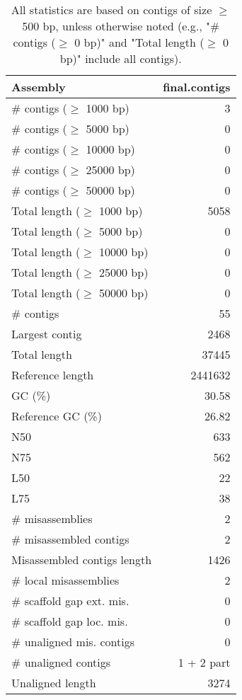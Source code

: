 \documentclass[12pt,a4paper]{article}
\begin{document}
\begin{table}[ht]
\begin{center}
\caption{All statistics are based on contigs of size $\geq$ 500 bp, unless otherwise noted (e.g., "\# contigs ($\geq$ 0 bp)" and "Total length ($\geq$ 0 bp)" include all contigs).}
\begin{tabular}{|l*{1}{|r}|}
\hline
Assembly & final.contigs \\ \hline
\# contigs ($\geq$ 1000 bp) & 3 \\ \hline
\# contigs ($\geq$ 5000 bp) & 0 \\ \hline
\# contigs ($\geq$ 10000 bp) & 0 \\ \hline
\# contigs ($\geq$ 25000 bp) & 0 \\ \hline
\# contigs ($\geq$ 50000 bp) & 0 \\ \hline
Total length ($\geq$ 1000 bp) & 5058 \\ \hline
Total length ($\geq$ 5000 bp) & 0 \\ \hline
Total length ($\geq$ 10000 bp) & 0 \\ \hline
Total length ($\geq$ 25000 bp) & 0 \\ \hline
Total length ($\geq$ 50000 bp) & 0 \\ \hline
\# contigs & 55 \\ \hline
Largest contig & 2468 \\ \hline
Total length & 37445 \\ \hline
Reference length & 2441632 \\ \hline
GC (\%) & 30.58 \\ \hline
Reference GC (\%) & 26.82 \\ \hline
N50 & 633 \\ \hline
N75 & 562 \\ \hline
L50 & 22 \\ \hline
L75 & 38 \\ \hline
\# misassemblies & 2 \\ \hline
\# misassembled contigs & 2 \\ \hline
Misassembled contigs length & 1426 \\ \hline
\# local misassemblies & 2 \\ \hline
\# scaffold gap ext. mis. & 0 \\ \hline
\# scaffold gap loc. mis. & 0 \\ \hline
\# unaligned mis. contigs & 0 \\ \hline
\# unaligned contigs & 1 + 2 part \\ \hline
Unaligned length & 3274 \\ \hline

\end{tabular}
\end{center}
\end{table}
\end{document}
